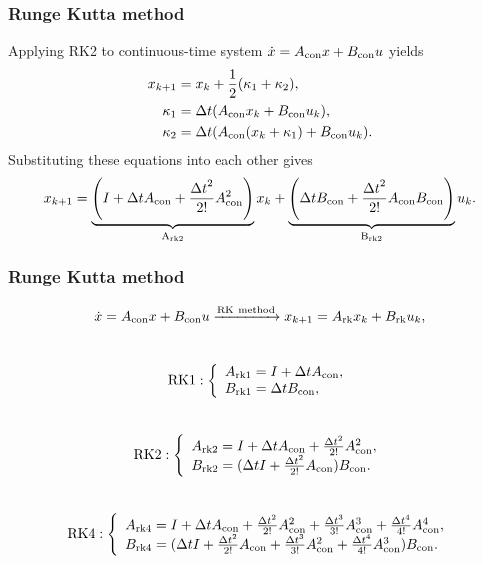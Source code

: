 \documentclass[student, noshadow, lsr, english, aspectratio=169]{ITR_LSR_slides}
\begin{document}
\begin{frame}
	\frametitle{Runge Kutta method}
Applying RK2 to continuous-time system $\dot{x} = A_{\rm{con}} x + B_{\rm{con}} u$ yields
\begin{equation}
		\begin{split}
				x_{k+1} &= x_k + \frac{1}{2}(\kappa_1 + \kappa_2),\\
				\kappa_1 &= \Delta t (A_{\rm{con}}x_k+B_{\rm{con}}u_k),\\
				\kappa_2 &= \Delta t (A_{\rm{con}}(x_k+\kappa_1)+B_{\rm{con}}u_k).\\
		\end{split}
\end{equation}
Substituting these equations into each other gives 
\begin{equation}
		x_{k+1} = \underbrace{\left(I + \Delta t A_{\rm{con}} + \frac{{\Delta t}^2}{2!}A_{\rm{con}}^2\right)}_{\rm{A_{rk2}}} x_k+ \underbrace{\left(\Delta t  B_{\rm{con}}  + \frac{{\Delta t}^2}{2!}A_{\rm{con}}B_{\rm{con}}\right)}_{\rm{B_{rk2}}}u_k.
\end{equation}
\end{frame}

\begin{frame}
	\frametitle{Runge Kutta method}
$$
\dot{x} = A_{\rm {con}}x + B_{\rm {con}}u \xrightarrow{\text{RK}\ \text{method}} x_{k+1}= A_{\rm{rk}}x_k + B_{\rm{rk}}u_k,
$$
\\[2ex]
$$
\text{RK1}:\left\{\begin{array}{l}
	A_{\rm{rk1}} = I + \Delta t A_{\rm{con}},\\
	B_{\rm{rk1}} = \Delta tB_{\rm{con}},\\
\end{array}\right.
$$
\\[2ex]
$$
\text{RK2}:\left\{\begin{array}{l}
	A_{\rm{rk2}} = I + \Delta t A_{\rm{con}} + \frac{{\Delta t}^2}{2!}A_{\rm{con}}^2,\\
	B_{\rm{rk2}} = (\Delta t I  + \frac{{\Delta t}^2}{2!}A_{\rm{con}})B_{\rm{con}}.\\
\end{array}\right.
$$
\\[2ex]
$$
\text{RK4}:\left\{\begin{array}{l}
    A_{\rm{rk4}} = I + \Delta t A_{\rm{con}} + \frac{{\Delta t}^2}{2!}A_{\rm{con}}^2 + \frac{{\Delta t}^3}{3!}A_{\rm{con}}^3 + \frac{{\Delta t}^4}{4!}A_{\rm{con}}^4,\\
    B_{\rm{rk4}} = (\Delta t I  + \frac{{\Delta t}^2}{2!}A_{\rm{con}} + \frac{{\Delta t}^3}{3!}A_{\rm{con}}^2 + \frac{{\Delta t}^4}{4!}A_{\rm{con}}^3)B_{\rm{con}}.
\end{array}\right.
$$
\end{frame}
\end{document}
